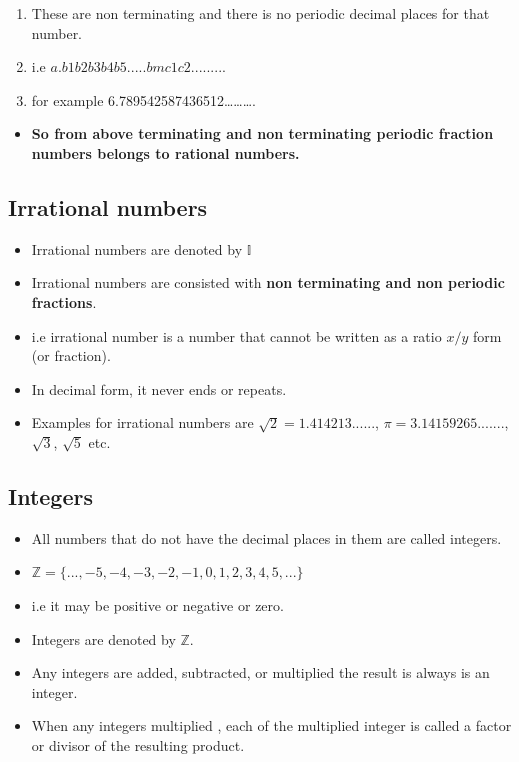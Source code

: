 \documentclass[]{book}
\providecommand{\tightlist}{%
  \setlength{\itemsep}{0pt}\setlength{\parskip}{0pt}}
\begin{document}
\begin{enumerate}
\def\labelenumi{\alph{enumi}.}
\tightlist
\item
  These are non terminating and there is no periodic decimal places for that number.
\item
  i.e \(a.b1b2b3b4b5 .....bmc1c2.........\)
\item
  for example 6.789542587436512\ldots{}\ldots{}\ldots{}.
\end{enumerate}

\begin{itemize}
\tightlist
\item
  \textbf{So from above terminating and non terminating periodic fraction numbers belongs to rational numbers.}
\end{itemize}

\hypertarget{irrational-numbers}{%
\subsection{Irrational numbers}\label{irrational-numbers}}

\begin{itemize}
\tightlist
\item
  Irrational numbers are denoted by \(\mathbb{I}\)
\item
  Irrational numbers are consisted with \textbf{non terminating and non periodic fractions}.
\item
  i.e irrational number is a number that cannot be written as a ratio \(x/y\) form (or fraction).
\item
  In decimal form, it never ends or repeats.
\item
  Examples for irrational numbers are \(\sqrt{2} = 1.414213......\), \(\pi = 3.14159265.......\), \(\sqrt{3}\), \(\sqrt{5}\) etc.
\end{itemize}

\hypertarget{integers}{%
\subsection{Integers}\label{integers}}

\begin{itemize}
\tightlist
\item
  All numbers that do not have the decimal places in them are called integers.
\item
  \(\mathbb{Z} = \{...,-5,-4,-3,-2,-1,0,1,2,3,4,5,...\}\)
\item
  i.e it may be positive or negative or zero.
\item
  Integers are denoted by \(\mathbb{Z}\).
\item
  Any integers are added, subtracted, or multiplied the result is always is an integer.
\item
  When any integers multiplied , each of the multiplied integer is called a factor or divisor of the resulting product.
\end{itemize}
\end{document}
